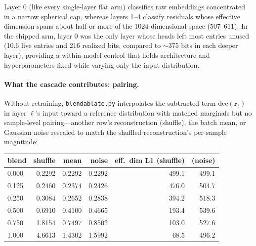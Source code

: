 Layer 0 (like every single-layer flat arm) classifies raw embeddings
concentrated in a narrow spherical cap, whereas layers 1--4 classify
residuals whose effective dimension spans about half or more of the
1024-dimensional space ($507$--$611$). In the shipped arm, layer 0 was the only layer
whose heads left most entries unused (10.6 live entries and 216 realized
bits, compared to ${\sim}375$ bits in each deeper layer), providing a
within-model control that holds architecture and hyperparameters fixed
while varying only the input distribution.

\paragraph{What the cascade contributes: pairing.}
Without retraining, \texttt{blendablate.py} interpolates the subtracted
term $\mathrm{dec}(\mathbf{r}_\ell)$ in layer $\ell$'s input toward a
reference distribution with matched marginals but no sample-level
pairing---another row's reconstruction (shuffle), the batch mean, or
Gaussian noise rescaled to match the shuffled reconstruction's per-sample
magnitude:

\begin{center}\small
\begin{tabular}{@{}lrrrrr@{}}
\toprule
blend & shuffle & mean & noise & eff.\ dim L1 (shuffle) & (noise) \\
\midrule
0.000 & 0.2292 & 0.2292 & 0.2292 & 499.1 & 499.1 \\
0.125 & 0.2460 & 0.2374 & 0.2426 & 476.0 & 504.7 \\
0.250 & 0.3084 & 0.2652 & 0.2838 & 394.2 & 518.3 \\
0.500 & 0.6910 & 0.4100 & 0.4665 & 193.4 & 539.6 \\
0.750 & 1.8154 & 0.7497 & 0.8502 & 103.0 & 527.6 \\
1.000 & 4.6613 & 1.4302 & 1.5992 & 68.5 & 496.2 \\
\bottomrule
\end{tabular}
\end{center}

